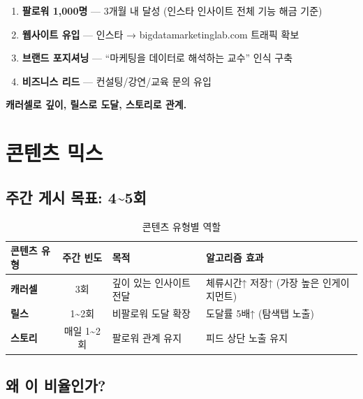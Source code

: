 \documentclass[11pt, a4paper]{article}
\begin{document}
\begin{enumerate}[leftmargin=2em]
  \item \textbf{팔로워 1,000명} — 3개월 내 달성 (인스타 인사이트 전체 기능 해금 기준)
  \item \textbf{웹사이트 유입} — 인스타 → bigdatamarketinglab.com 트래픽 확보
  \item \textbf{브랜드 포지셔닝} — ``마케팅을 데이터로 해석하는 교수'' 인식 구축
  \item \textbf{비즈니스 리드} — 컨설팅/강연/교육 문의 유입
\end{enumerate}

\begin{tcolorbox}[title={한 줄 전략}]
\centering\large\textbf{캐러셀로 깊이, 릴스로 도달, 스토리로 관계.}
\end{tcolorbox}


\section{콘텐츠 믹스}

\subsection{주간 게시 목표: 4\textasciitilde 5회}

\begin{table}[h!]
\centering
\begin{tabularx}{\textwidth}{l c Y Y}
\toprule
\textbf{콘텐츠 유형} & \textbf{주간 빈도} & \textbf{목적} & \textbf{알고리즘 효과} \\
\midrule
\textbf{캐러셀} & 3회 & 깊이 있는 인사이트 전달 & 체류시간↑ 저장↑ (가장 높은 인게이지먼트) \\
\textbf{릴스} & 1\textasciitilde 2회 & 비팔로워 도달 확장 & 도달률 5배↑ (탐색탭 노출) \\
\textbf{스토리} & 매일 1\textasciitilde 2회 & 팔로워 관계 유지 & 피드 상단 노출 유지 \\
\bottomrule
\end{tabularx}
\caption{콘텐츠 유형별 역할}
\end{table}

\subsection{왜 이 비율인가?}
\end{document}
